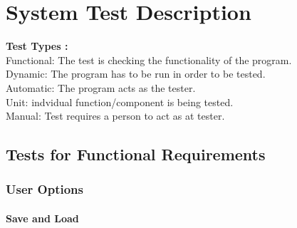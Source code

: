 \documentclass[12pt, titlepage]{article}
\begin{document}
\section{System Test Description}
{ \color{blue}
\textbf{Test Types :}\\
		  Functional: The test is checking the functionality of the program.\\
		  Dynamic: The program has to be run in order to be tested.\\
		  Automatic: The program acts as the tester.\\
		  Unit: indvidual function/component is being tested.\\
		Manual: Test requires a person to act as at tester.} 
\subsection{Tests for Functional Requirements}
\subsubsection{User Options}
\paragraph{Save and Load}
\end{document}
